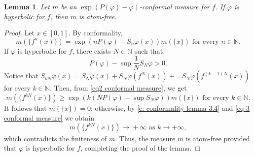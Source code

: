 \documentclass[12pt]{amsart}
\numberwithin{equation}{section} %
\numberwithin{figure}{section} %
\theoremstyle{plain}
\newtheorem{lemm}[prop]{Lemma}
\theoremstyle{definition}
\theoremstyle{remark}
\theoremstyle{citing}
\newcommand{\N}{\mathbb{N}}
\renewcommand{\=}{\coloneqq}
\begin{document}
\begin{lemm}\label{lemma atoms of conformal measure}
    Let $m$ be an $\exp(P(\varphi)-\varphi)$-conformal measure for $f$. If $\varphi$ is hyperbolic for $f$, then $m$ is atom-free.
\end{lemm}
\begin{proof} Let $x\in [0,1]$. By conformality,
      \begin{equation}\label{eq2 conformal measure}
          m(\{f^{n}(x)\})= \exp(nP(\varphi) - S_{n} \varphi(x))m(\{x\}) \text{ for every }n\in\N.
      \end{equation}
   If $\varphi$ is hyperbolic for $f$, there exists $N\in \N$ such that
   \begin{equation}\label{e: conformality lemma 3.4}
       P(\varphi) - \sup \frac{1}{N} S_N \varphi >0.
   \end{equation}
      Notice that $S_{kN}\varphi(x) = S_N\varphi(x) + S_N\varphi(f^N(x))+\dots S_N \varphi(f^{(k-1)N}(x))$ for every $k\in\N$. Then, from \eqref{eq2 conformal measure}, we get
      \begin{equation}\label{eq 3 conformal measure}
          m(\{f^{kN}(x)\}) \geq \exp(k(NP(\varphi) - \sup S_N \varphi))m(\{x\}) \text{ for every }k\in\N.
      \end{equation}
    It follows that $m(\{x\})=0$; otherwise, by \eqref{e: conformality lemma 3.4} and \eqref{eq 3 conformal measure} we obtain \begin{equation*}
        m(\{f^{kN}(x)\})\xrightarrow[]{} +\infty \text{ as }k\to +\infty,
    \end{equation*}
      which contradicts the finiteness of $m$. Thus, the measure $m$ is atom-free provided that $\varphi$ is hyperbolic for $f$, completing the proof of the lemma.
\end{proof}
\end{document}
